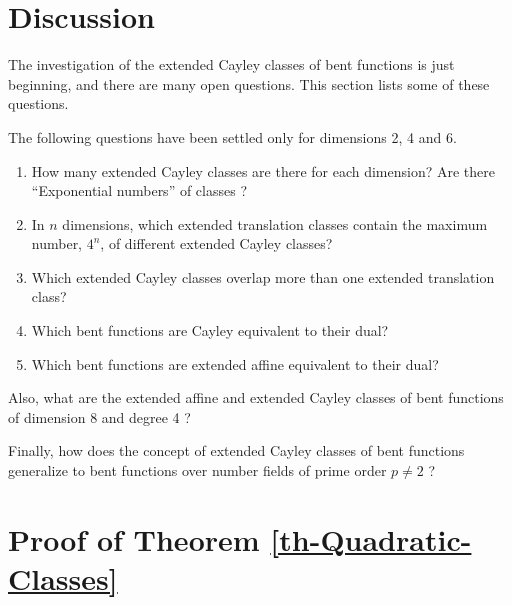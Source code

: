 \documentclass[12pt,a4paper]{article}
\begin{document}
\section{Discussion}
\label{sec-Discussion}
The investigation of the extended Cayley classes of bent functions is just beginning, and there are many open questions.
This section lists some of these questions.

The following questions have been settled only for dimensions 2, 4 and 6.
\begin{enumerate}
\item
How many extended Cayley classes are there for each dimension?
Are there ``Exponential numbers'' of classes  \cite{Kan83exponential}?
\item
In $n$ dimensions,
which extended translation classes contain the maximum number, $4^n$, of different extended Cayley classes?
\item
Which extended Cayley classes overlap more than one extended translation class?
\item
Which bent functions are Cayley equivalent to their dual?
\item
Which bent functions are extended affine equivalent to their dual?
\end{enumerate}

Also, what are the extended affine and extended Cayley classes of bent functions of dimension 8 and degree 4 \cite{LanL11counting}?

Finally, how does the concept of extended Cayley classes of bent functions generalize to bent functions over number fields of prime order $p \neq 2$
\cite{CheTZ11}?


\appendix

\section{Proof of Theorem \ref{th-Quadratic-Classes}}
\label{app-proof-of}
\end{document}
